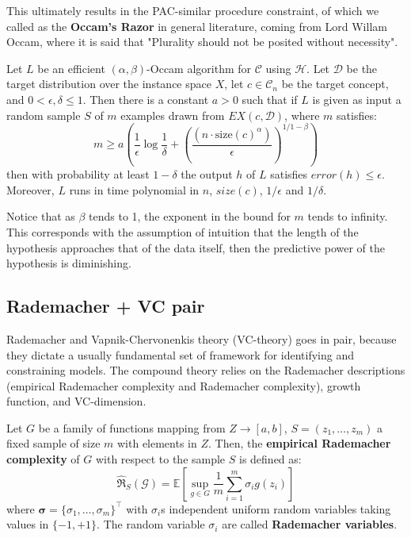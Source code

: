 \documentclass{article}
\begin{document}
This ultimately results in the PAC-similar procedure constraint, of which we called as the \textbf{Occam's Razor} in general literature, coming from Lord Willam Occam, where it is said that "Plurality should not be posited without necessity". 
\begin{theorem}\label{eq:Occam1}
    Let $L$ be an efficient $(\alpha,\beta)$-Occam algorithm for $\mathcal{C}$ using $\mathcal{H}$. Let $\mathcal{D}$ be the target distribution over the instance space $X$, let $c\in \mathcal{C}_{n}$ be the target concept, and $0< \epsilon, \delta \leq 1$. Then there is a constant $a>0$ such that if $L$ is given as input a random sample $S$ of $m$ examples drawn from $EX(c,\mathcal{D})$, where $m$ satisfies: 
    \begin{equation}
        m \geq a \left( \frac{1}{\epsilon} \log{\frac{1}{\delta}} + \left(\frac{(n\cdot \mathrm{size}(c)^{\alpha})}{\epsilon}\right)^{1/1-\beta} \right)
    \end{equation}
    then with probability at least $1-\delta$ the output $h$ of $L$ satisfies $error(h)\leq \epsilon$. Moreover, $L$ runs in time polynomial in $n$, $size(c)$, $1/\epsilon$ and $1/\delta$.
\end{theorem}
Notice that as $\beta$ tends to 1, the exponent in the bound for $m$ tends to infinity. This corresponds with the assumption of intuition that the length of the hypothesis approaches that of the data itself, then the predictive power of the hypothesis is diminishing. 

\subsection{Rademacher + VC pair}

Rademacher and Vapnik-Chervonenkis theory (VC-theory) goes in pair, because they dictate a usually fundamental set of framework for identifying and constraining models. The compound theory relies on the Rademacher descriptions (empirical Rademacher complexity and Rademacher complexity), growth function, and VC-dimension. \cite{10.5555/2371238,STL_Hajek_Maxim_2021,10.5555/2930837}

Let $G$ be a family of functions mapping from $Z\to [a,b]$, $S=(z_1,\dots, z_m)$ a fixed sample of size $m$ with elements in $Z$. Then, the \textbf{empirical Rademacher complexity} of $G$ with respect to the sample $S$ is defined as:
\begin{equation*}
    \hat{\mathfrak{R}}_S (\mathcal{G}) = \mathbb{E} \left[ \sup_{g\in G} \frac{1}{m} \sum^{m}_{i=1} \sigma_i g(z_i) \right]
\end{equation*}
where $\bm{\sigma}=\{\sigma_1,\dots,\sigma_m\}^{\top}$ with $\sigma_i$s independent uniform random variables taking values in $\{-1,+1\}$. The random variable $\sigma_i$ are called \textbf{Rademacher variables}.
\end{document}
